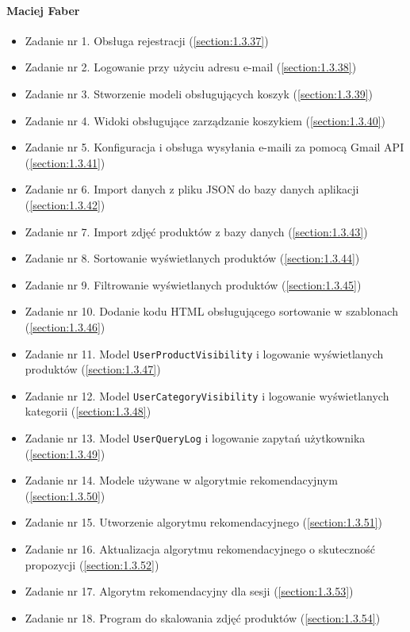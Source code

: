 \documentclass[12pt,a4paper,oneside]{article}
\theoremstyle{definition}
\numberwithin{equation}{section}
\begin{document}
\paragraph{Maciej Faber}
\begin{itemize}
    \item Zadanie nr 1. Obsługa rejestracji (\ref{section:1.3.37})
    \item Zadanie nr 2. Logowanie przy użyciu adresu e-mail (\ref{section:1.3.38})
    \item Zadanie nr 3. Stworzenie modeli obsługujących koszyk (\ref{section:1.3.39})
    \item Zadanie nr 4. Widoki obsługujące zarządzanie koszykiem (\ref{section:1.3.40})
    \item Zadanie nr 5. Konfiguracja i obsługa wysyłania e-maili za pomocą Gmail API (\ref{section:1.3.41})
    \item Zadanie nr 6. Import danych z pliku JSON do bazy danych aplikacji (\ref{section:1.3.42})
    \item Zadanie nr 7. Import zdjęć produktów z bazy danych (\ref{section:1.3.43})
    \item Zadanie nr 8. Sortowanie wyświetlanych produktów (\ref{section:1.3.44})
    \item Zadanie nr 9. Filtrowanie wyświetlanych produktów (\ref{section:1.3.45})
    \item Zadanie nr 10. Dodanie kodu HTML obsługującego sortowanie w szablonach (\ref{section:1.3.46})
    \item Zadanie nr 11. Model \texttt{UserProductVisibility} i logowanie wyświetlanych produktów (\ref{section:1.3.47})
    \item Zadanie nr 12. Model \texttt{UserCategoryVisibility} i logowanie wyświetlanych kategorii (\ref{section:1.3.48})
    \item Zadanie nr 13. Model \texttt{UserQueryLog} i logowanie zapytań użytkownika (\ref{section:1.3.49})
    \item Zadanie nr 14. Modele używane w algorytmie rekomendacyjnym (\ref{section:1.3.50})
    \item Zadanie nr 15. Utworzenie algorytmu rekomendacyjnego (\ref{section:1.3.51})
    \item Zadanie nr 16. Aktualizacja algorytmu rekomendacyjnego o skuteczność propozycji (\ref{section:1.3.52})
    \item Zadanie nr 17. Algorytm rekomendacyjny dla sesji (\ref{section:1.3.53})
    \item Zadanie nr 18. Program do skalowania zdjęć produktów (\ref{section:1.3.54})
\end{itemize}
\end{document}
